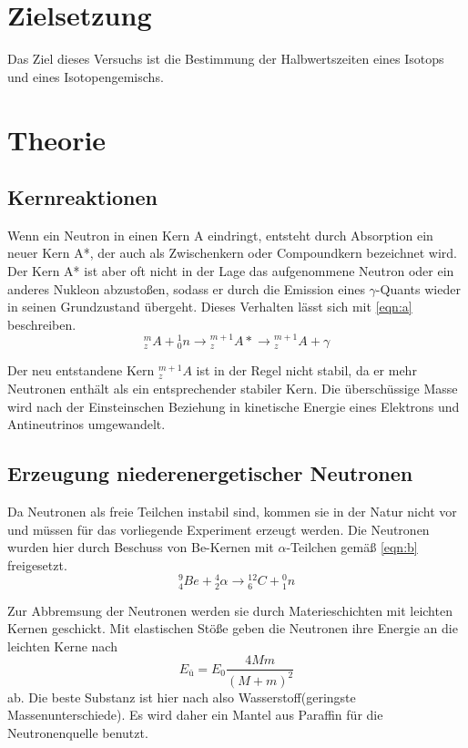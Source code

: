 \section*{Zielsetzung}
\label{sec:zielsetzung}

Das Ziel dieses Versuchs ist die Bestimmung der Halbwertszeiten eines Isotops und eines Isotopengemischs. 

\section{Theorie}
\label{sec:Theorie}


\subsection{Kernreaktionen}
\label{sec:a}
Wenn ein Neutron in einen Kern A eindringt, entsteht durch Absorption ein neuer Kern A*, der auch als Zwischenkern oder Compoundkern bezeichnet wird. Der Kern A* ist aber oft nicht in der Lage das aufgenommene Neutron oder ein anderes Nukleon abzustoßen, sodass er durch die Emission eines $\gamma$-Quants wieder in seinen Grundzustand übergeht. Dieses Verhalten lässt sich mit \autoref{eqn:a} beschreiben. 
\begin{equation}
    \label{eqn:a}
    {^{m}_{z}A} + {^{1}_{0}n} \rightarrow {^{m+1}_{z}A*} \rightarrow {^{m+1}_{z}A} + \gamma
\end{equation}


Der neu entstandene Kern ${^{m+1}_{z}A}$ ist in der Regel nicht stabil, da er mehr Neutronen enthält als ein entsprechender stabiler Kern. Die überschüssige Masse wird nach der Einsteinschen Beziehung in kinetische Energie eines Elektrons und Antineutrinos umgewandelt.
\\


\subsection{Erzeugung niederenergetischer Neutronen}
\label{sec:erzeugung}
Da Neutronen als freie Teilchen instabil sind, kommen sie in der Natur nicht vor und müssen für das vorliegende Experiment erzeugt werden. Die Neutronen wurden hier durch Beschuss von Be-Kernen mit $\alpha$-Teilchen gemäß \autoref{eqn:b} freigesetzt.
\begin{equation}
    \label{eqn:b}
    {^{9}_{4}Be} + {^{4}_{2}\alpha} \rightarrow {^{12}_{6}C}+{^{0}_{1}n}
\end{equation}

Zur Abbremsung der Neutronen werden sie durch Materieschichten mit leichten Kernen geschickt. Mit elastischen Stöße geben die Neutronen ihre Energie an
die leichten Kerne nach  
\begin{equation}
	E_\text{ü} = E_0 \frac{4Mm}{(M+m)^2}
		\label{eqn:e}
\end{equation}
ab. Die beste Substanz ist hier nach also Wasserstoff(geringste Massenunterschiede). Es wird daher ein Mantel aus Paraffin für die Neutronenquelle benutzt.

